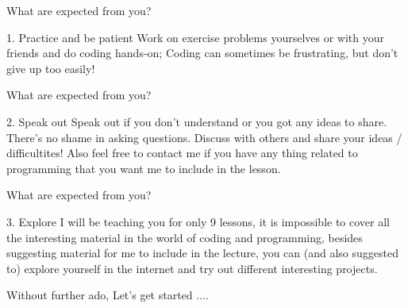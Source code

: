 \documentclass[10pt,xcolor={table,dvipsnames},t]{beamer}
\begin{document}
\begin{frame}{What are expected from you?}
  \begin{block}{1. Practice and be patient}
    Work on exercise problems yourselves or with your friends and do coding hands-on; Coding can sometimes be frustrating, but don't give up too easily! 
  \end{block}
\end{frame}
\begin{frame}{What are expected from you?}
  \begin{block}{2. Speak out}
    Speak out if you don't understand or you got any ideas to share. There's no shame in asking questions. Discuss with others and share your ideas / difficultites! Also feel free to contact me if you have any thing related to programming that you want me to include in the lesson.
  \end{block}
\end{frame}
\begin{frame}{What are expected from you?}
  \begin{block}{3. Explore}
    I will be teaching you for only 9 lessons, it is impossible to cover all the interesting material in the world of coding and programming, besides suggesting material for me to include in the lecture, you can (and also suggested to) explore yourself in the internet and try out different interesting projects.
  \end{block}
\end{frame}
\begin{frame}{Without further ado, Let's get started ....}
  
\end{frame}
\end{document}
